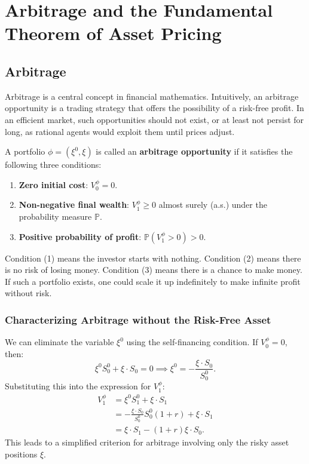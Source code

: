 \chapter{Arbitrage and the Fundamental Theorem of Asset Pricing}

\section{Arbitrage}

Arbitrage is a central concept in financial mathematics. Intuitively, an arbitrage opportunity is a trading strategy that offers the possibility of a risk-free profit. In an efficient market, such opportunities should not exist, or at least not persist for long, as rational agents would exploit them until prices adjust.

\begin{definition}
A portfolio $\phi = (\xi^0, \xi)$ is called an \textbf{arbitrage opportunity} if it satisfies the following three conditions:
\begin{enumerate}
    \item \textbf{Zero initial cost}: $V_0^\phi = 0$.
    \item \textbf{Non-negative final wealth}: $V_1^\phi \ge 0$ almost surely (a.s.) under the probability measure $\mathbb{P}$.
    \item \textbf{Positive probability of profit}: $\mathbb{P}(V_1^\phi > 0) > 0$.
\end{enumerate}
\end{definition}

Condition (1) means the investor starts with nothing. Condition (2) means there is no risk of losing money. Condition (3) means there is a chance to make money. If such a portfolio exists, one could scale it up indefinitely to make infinite profit without risk.

\subsection{Characterizing Arbitrage without the Risk-Free Asset}

We can eliminate the variable $\xi^0$ using the self-financing condition. If $V_0^\phi = 0$, then:
\begin{equation}
    \xi^0 S_0^0 + \xi \cdot S_0 = 0 \implies \xi^0 = - \frac{\xi \cdot S_0}{S_0^0}.
\end{equation}
Substituting this into the expression for $V_1^\phi$:
\begin{align}
    V_1^\phi &= \xi^0 S_1^0 + \xi \cdot S_1 \\
    &= - \frac{\xi \cdot S_0}{S_0^0} S_0^0 (1+r) + \xi \cdot S_1 \\
    &= \xi \cdot S_1 - (1+r) \xi \cdot S_0.
\end{align}
This leads to a simplified criterion for arbitrage involving only the risky asset positions $\xi$.

